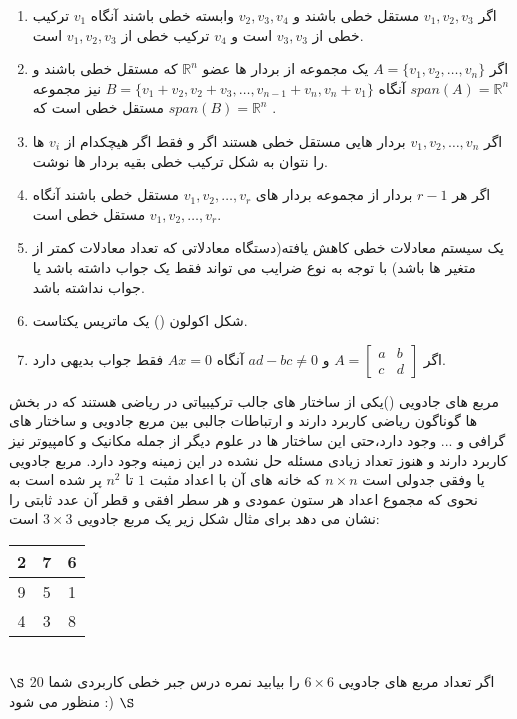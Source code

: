 \documentclass{article}
\begin{document}
\begin{enumerate}
\item
اگر 
$v_1,v_2,v_3$
مستقل خطی باشند و 
$v_2,v_3,v_4$
وابسته خطی باشند آنگاه 
$v_1$
ترکیب خطی از 
$v_3,v_3$
است و 
$v_4$
ترکیب خطی از 
$v_1,v_2,v_3$
است.
\item 
اگر 
$A=\{v_1,v_2,\ldots,v_n\}$
یک مجموعه از بردار ها عضو 
$\mathbb{R}^n$
 که مستقل خطی باشند و 
 $span(A)=\mathbb{R}^n$
 آنگاه
 $B=\{v_1+v_2,v_2+v_3,\ldots,v_{n-1}+v_n,v_n+v_1\}$
 نیز مجموعه مستقل خطی است که 
  $span(B)=\mathbb{R}^n$
  .
  \item 
  اگر 
  $v_1,v_2,\ldots,v_n$
  بردار هایی مستقل خطی هستند اگر و فقط اگر هیچکدام از 
  $v_i$
  ها را نتوان به شکل ترکیب خطی بقیه بردار ها نوشت.
  \item 
  اگر هر 
  $r-1$
  بردار از مجموعه بردار های 
  $v_1,v_2,\ldots,v_r$
  مستقل خطی باشند آنگاه 
   $v_1,v_2,\ldots,v_r$
   مستقل خطی است.
   \item 
   یک سیستم معادلات خطی کاهش یافته(دستگاه معادلاتی که تعداد معادلات کمتر از متغیر ها باشد) با توجه به نوع ضرایب می تواند  فقط یک جواب داشته باشد یا جواب نداشته باشد.
   \item 
   شکل اکولون () یک ماتریس یکتاست.
   \item 
   اگر 
   $A=\begin{bmatrix}
   a&b\\
   c&d
   \end{bmatrix}$
   و
   $ad-bc\neq0$
   آنگاه 
   $Ax=0$
   فقط جواب بدیهی دارد.
\end{enumerate}
\clearpage
{}
مربع های جادویی ()یکی از ساختار های جالب ترکیبیاتی در ریاضی هستند که در بخش ها گوناگون ریاضی کاربرد دارند و ارتباطات جالبی بین مربع جادویی و ساختار های گرافی و ... وجود دارد،حتی این ساختار ها در علوم دیگر از جمله مکانیک و کامپیوتر نیز کاربرد دارند و هنوز تعداد زیادی مسئله حل نشده در این زمینه وجود دارد.
مربع جادویی یا وفقی جدولی است 
$n\times n$
که خانه های آن با اعداد مثبت 
$1$
تا 
$n^2$
پر شده است به نحوی که مجموع اعداد هر ستون عمودی و هر سطر افقی و قطر آن عدد ثابتی را نشان می دهد برای مثال شکل زیر یک مربع جادویی 
$3\times 3$
است:
\begin{table}[!hpb]
	\centering
	\begin{tabular}{|c|c|c|}
		\hline
		2&7&6\\
		\hline 
		9&5&1\\
		\hline
		4&3&8\\
		\hline
		
	\end{tabular}		
\end{table}
\\
$\S$
اگر تعداد مربع های جادویی 
$6\times 6$
را بیابید نمره درس جبر خطی کاربردی شما 20 منظور می شود :) 
$\S$
\end{document}
